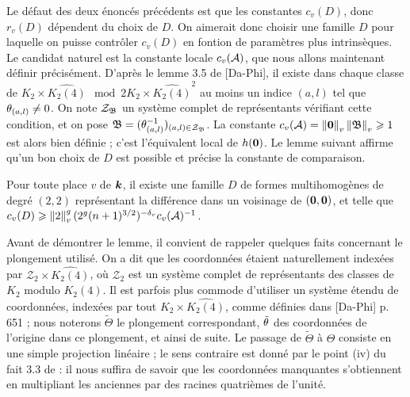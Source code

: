 Le défaut des deux énoncés précédents est que les constantes $c_v(D)$, donc
$r_v(D)$ dépendent  du choix de $D$. On aimerait donc choisir
une famille $D$ pour laquelle on puisse contrôler $c_v(D)$ en fontion de
paramètres plus intrinsèques. Le candidat naturel est la constante locale
$c_v(\mathcal{A})$, que nous allons maintenant définir précisément. D'après le lemme
3.5 de [Da-Phi], il existe dans chaque classe de $K_2 \times \widehat{K_2(4)}
\mod 2K_2 \times \widehat{K_2(4)}^2$ au moins un indice $(a, l)$ tel que
$\theta_{(a,l)} \neq 0$. On note $\mathcal{Z}_{\mathfrak{B}}$ un système complet de
représentants vérifiant cette condition, et on pose $\mathfrak{B} = (\theta_{(a,
  l)}^{-1})_{(a, l) \in \mathcal{Z}_{\mathfrak{B}}}$. La constante $c_v(\mathcal{A}) =
\left\lVert{\boldsymbol{0}}\right\rVert_{v}\left\lVert\mathfrak{B}\right\rVert_{v} \geqslant 1$ est alors bien définie ; c'est l'équivalent local de
$h({\boldsymbol{0}})$. Le lemme suivant affirme qu'un bon choix de $D$ est possible et
précise la constante de comparaison.

\begin{lem} \label{RayonAbs}
  Pour toute place $v$ de $\boldsymbol{k}$, il existe une famille $D$ de formes
  multihomogènes de degré $(2, 2)$ représentant la différence dans un
  voisinage de $({\boldsymbol{0}}, {\boldsymbol{0}})$, et telle que $c_v(D) \geqslant
  \left\lVert2\right\rVert_{v}^g(2^g(n+1)^{3/2})^{-{\delta_v}} c_v(\mathcal{A})^{-1}$.
\end{lem}

Avant de démontrer le lemme, il convient de rappeler quelques faits concernant
le plongement utilisé. On a dit que les coordonnées étaient naturellement
indexées par $\mathcal{Z}_2 \times \widehat{K_2(4)}$, où $\mathcal{Z}_2$ est
un système complet de représentants des classes de $K_2$ modulo $K_2(4)$. Il
est parfois plus commode d'utiliser un système étendu de coordonnées, indexées
par tout $K_2 \times \widehat{K_2(4)}$, comme définies dans [Da-Phi] p. 651 ;
nous noterons $\tilde{\Theta}$ le plongement correspondant, $\tilde{\theta}$ des
coordonnées de l'origine dans ce plongement, et ainsi de suite. Le passage de
$\tilde{\Theta}$ à $\Theta$ consiste en une simple projection linéaire ; le
sens contraire est donné par le point (iv) du fait 3.3 de  : il
nous suffira de savoir que les coordonnées manquantes s'obtiennent en
multipliant les anciennes par des racines quatrièmes de l'unité.

